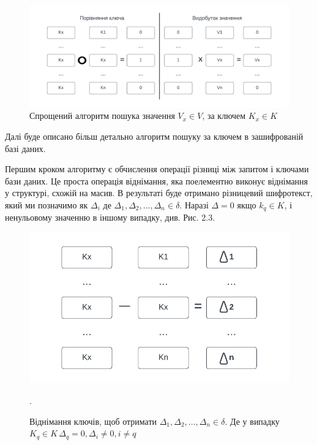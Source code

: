 \begin{itemize}
{\begin{figure}[!ht]
    \label{fig:basic-value-extraction}
    \includegraphics[scale=0.85]{static/basic-value-extraction.png} 
    \caption{Спрощений алгоритм пошука значення \(V_x \in V\), за ключем \(K_x \in K\)}
\end{figure}

    Далі буде описано більш детально алгоритм пошуку за ключем в зашифрованій базі даних.
    
    Першим кроком алгоритму є обчислення операції різниці між запитом і ключами бази даних. Це
    проста операція віднімання, яка поелементно виконує віднімання у структурі, схожій на масив. В
    результаті буде отримано різницевий шифротекст, який ми позначимо як \(\Delta_i\) де
\(\Delta_1,\Delta_2,...,\Delta_n \in \delta\). Наразі 
    \(\Delta = 0\) якщо \(k_q \in K\), і ненульовому значенню в іншому випадку, див. Рис. 2.3.

\begin{figure}[!ht]
    \centering
    \label{fig:key-subsruction}
    \includegraphics[scale=1.25]{static/key-substruction.png}
    \caption{Віднімання ключів, щоб отримати \(\Delta_1,\Delta_2,...,\Delta_n \in \delta\).
    Де у випадку \(K_q \in K\, \Delta_q = 0, \Delta_i \neq 0, i \neq q\)}.
\end{figure}


}
\end{itemize}
